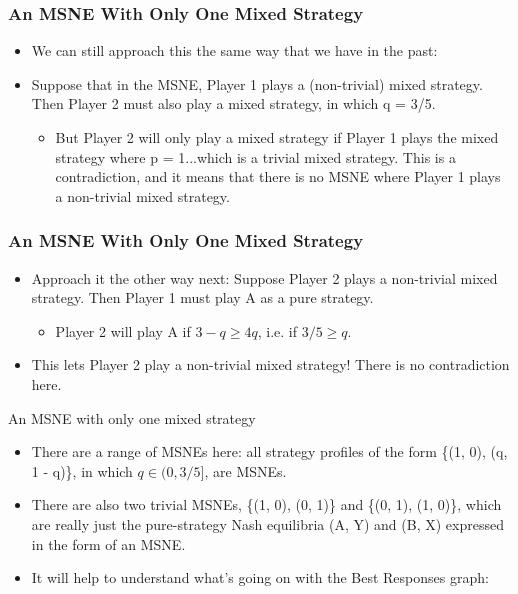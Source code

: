 \begin{frame}
\frametitle{An MSNE With Only One Mixed Strategy}
\begin{itemize}
	\item We can still approach this the same way that we have in the past:
	\item Suppose that in the MSNE, Player 1 plays a (non-trivial) mixed strategy. Then Player 2 must also play a mixed strategy, in which q = 3/5.
	\begin{itemize}
		\item But Player 2 will only play a mixed strategy if Player 1 plays the mixed strategy where p = 1...which is a trivial mixed strategy. This is a contradiction, and it means that there is no MSNE where Player 1 plays a non-trivial mixed strategy.
	\end{itemize}
\end{itemize}
\end{frame}

\begin{frame}
\frametitle{An MSNE With Only One Mixed Strategy}
\begin{itemize}
\item Approach it the other way next: Suppose Player 2 plays a non-trivial mixed strategy. Then Player 1 must play A as a pure strategy.
\begin{itemize}
	\item Player 2 will play A if $3 - q \geq 4q$, i.e. if $3/5 \geq q$.
\end{itemize}
\item This lets Player 2 play a non-trivial mixed strategy! There is no contradiction here.
\end{itemize}
\end{frame}

\begin{frame}{An MSNE with only one mixed strategy}
\begin{itemize}
\item There are a range of MSNEs here: all strategy profiles of the form \{(1, 0), (q, 1 - q)\}, in which $q \in (0, 3/5]$, are MSNEs.
\item There are also two trivial MSNEs, \{(1, 0), (0, 1)\} and \{(0, 1), (1, 0)\}, which are really just the pure-strategy Nash equilibria (A, Y) and (B, X) expressed in the form of an MSNE.
\item It will help to understand what's going on with the Best Responses graph:
\end{itemize}
\end{frame}

